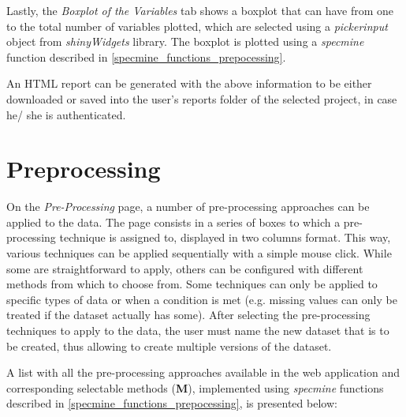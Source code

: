 Lastly, the \textit{Boxplot of the Variables} tab shows a boxplot that can have from one to the total number of variables plotted, which are selected using a \textit{pickerinput} object from \textit{shinyWidgets} library. The boxplot is plotted using a \textit{specmine} function described in \autoref{specmine_functions_prepocessing}.

An HTML report can be generated with the above information to be either downloaded or saved into the user's reports folder of the selected project, in case he/ she is authenticated.



\section{Preprocessing}

On the \textit{Pre-Processing} page, a number of pre-processing approaches can be applied to the data. The page consists in a series of boxes to which a pre-processing technique is assigned to, displayed in two columns format. This way, various techniques can be applied sequentially with a simple mouse click. While some are straightforward to apply, others can be configured with different methods from which to choose from. Some techniques can only be applied to specific types of data or when a condition is met (e.g. missing values can only be treated if the dataset actually has some). After selecting the pre-processing techniques to apply to the data, the user must name the new dataset that is to be created, thus allowing to create multiple versions of the dataset.

A list with all the pre-processing approaches available in the web application and corresponding selectable methods (\textbf{M}), implemented using \textit{specmine} functions described in \autoref{specmine_functions_prepocessing}, is presented below:


